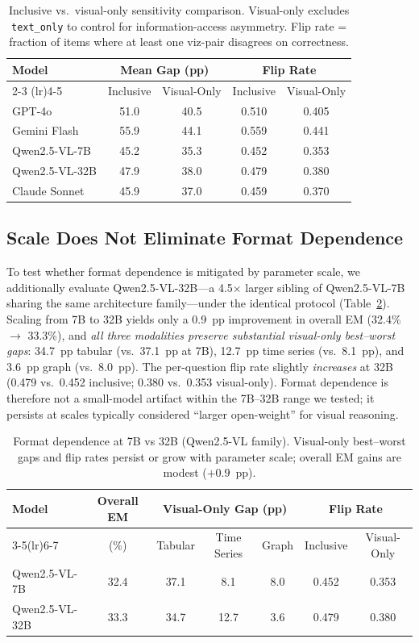 \documentclass{article}
\begin{document}
\begin{table}[t]
\centering
\small
\caption{Inclusive vs.\ visual-only sensitivity comparison. Visual-only excludes \texttt{text\_only} to control for information-access asymmetry. Flip rate = fraction of items where at least one viz-pair disagrees on correctness.}
\label{tab:visonly_compare}
\begin{tabular}{lcccc}
\toprule
Model & \multicolumn{2}{c}{Mean Gap (pp)} & \multicolumn{2}{c}{Flip Rate} \\
\cmidrule(lr){2-3} \cmidrule(lr){4-5}
 & Inclusive & Visual-Only & Inclusive & Visual-Only \\
\midrule
GPT-4o & 51.0 & 40.5 & 0.510 & 0.405 \\
Gemini Flash & 55.9 & 44.1 & 0.559 & 0.441 \\
Qwen2.5-VL-7B & 45.2 & 35.3 & 0.452 & 0.353 \\
Qwen2.5-VL-32B & 47.9 & 38.0 & 0.479 & 0.380 \\
Claude Sonnet & 45.9 & 37.0 & 0.459 & 0.370 \\
\bottomrule
\end{tabular}
\end{table}

\subsection{Scale Does Not Eliminate Format Dependence}
\label{sec:scale}
To test whether format dependence is mitigated by parameter scale, we additionally evaluate Qwen2.5-VL-32B---a 4.5$\times$ larger sibling of Qwen2.5-VL-7B sharing the same architecture family---under the identical protocol (Table~\ref{tab:scale}). Scaling from 7B to 32B yields only a 0.9~pp improvement in overall EM (32.4\% $\to$ 33.3\%), and \emph{all three modalities preserve substantial visual-only best--worst gaps}: 34.7~pp tabular (vs.\ 37.1~pp at 7B), 12.7~pp time series (vs.\ 8.1~pp), and 3.6~pp graph (vs.\ 8.0~pp). The per-question flip rate slightly \emph{increases} at 32B (0.479 vs.\ 0.452 inclusive; 0.380 vs.\ 0.353 visual-only). Format dependence is therefore not a small-model artifact within the 7B--32B range we tested; it persists at scales typically considered ``larger open-weight'' for visual reasoning.

\begin{table}[t]
\centering
\small
\caption{Format dependence at 7B vs 32B (Qwen2.5-VL family). Visual-only best--worst gaps and flip rates persist or grow with parameter scale; overall EM gains are modest ($+0.9$~pp).}
\label{tab:scale}
\begin{tabular}{lcccccc}
\toprule
Model & Overall EM & \multicolumn{3}{c}{Visual-Only Gap (pp)} & \multicolumn{2}{c}{Flip Rate} \\
\cmidrule(lr){3-5}\cmidrule(lr){6-7}
 & (\%) & Tabular & Time Series & Graph & Inclusive & Visual-Only \\
\midrule
Qwen2.5-VL-7B  & 32.4 & 37.1 & 8.1  & 8.0 & 0.452 & 0.353 \\
Qwen2.5-VL-32B & 33.3 & 34.7 & 12.7 & 3.6 & 0.479 & 0.380 \\
\bottomrule
\end{tabular}
\end{table}
\end{document}
